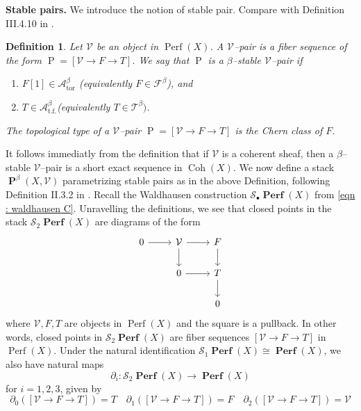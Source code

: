 \documentclass[11pt]{article}
\newtheorem{definition}{Definition}
\newcommand{\segal}{\mathcal{S}}
\newcommand{\fbeta}{\mathcal{F}^{\beta}}
\newcommand{\tbeta}{\mathcal{T}^{\beta}}
\newcommand{\abetator}{\mathcal{A}^{\beta}_{\operatorname{tor}}}
\newcommand{\abetatf}{\mathcal{A}^{\beta}_{\operatorname{t.f.}}}
\newcommand{\coh}{\operatorname{Coh}}
\newcommand{\perf}{\operatorname{Perf}(X)}
\newcommand{\perfstack}{\boldsymbol{\operatorname{Perf}}(X)}
\newcommand{\framing}{\mathcal{V}}
\newcommand{\pairs}{\boldsymbol{\operatorname{P}}^{\beta}(X,\mathcal{V})}
\newcommand{\waldhausen}{\mathcal{S}_{\bullet}}
\begin{document}
\noindent\textbf{Stable pairs. }We introduce the notion of stable pair. Compare with Definition III.4.10 in \cite{dps}.

\begin{definition}
    Let $\framing$ be an object in $\perf$. A $\framing$--pair is a fiber sequence of the form $\operatorname{P}= [\framing\rightarrow F \rightarrow T]$. We say that $\operatorname{P}$ is a $\beta$--stable $\framing$--pair if 
    \begin{enumerate}
        \item $F[1]\in \abetator$ (equivalently $F \in \fbeta$), and
        \item $T\in \abetatf$(equivalently $T \in \tbeta)$.
    \end{enumerate}
    The topological type of a $\framing$--pair $\operatorname{P}= [\framing\rightarrow F \rightarrow T]$ is the Chern class of $F$.
\end{definition}

\noindent It follows immediatly from the definition that if $\framing$ is a coherent sheaf, then a $\beta$--stable $\framing$--pair is a short exact sequence in $\coh(X)$. We now define a stack $\pairs$ parametrizing stable pairs as in the above Definition, following Definition II.3.2 in \cite{dps}. Recall the Waldhausen construction $\waldhausen\perfstack$ from \eqref{eqn : waldhausen C}. Unravelling the definitions, we see that closed points in the stack $\segal_2\perfstack$ are diagrams of the form 
\[\begin{tikzcd}
	0 & \framing& F \\
	& 0 & T \\
	&& 0
	\arrow[from=1-1, to=1-2]
	\arrow[from=1-2, to=1-3]
	\arrow[from=1-2, to=2-2]
	\arrow[from=1-3, to=2-3]
	\arrow[from=2-2, to=2-3]
	\arrow[from=2-3, to=3-3]
\end{tikzcd}\]
where $\framing, F, T$ are objects in $\perf$ and the square is a pullback. In other words, closed points in $\segal_2\perfstack$ are fiber sequences $[\framing\rightarrow F \rightarrow T]$ in $\perf$. Under the natural identification $\segal_1\perfstack \cong \perfstack$, we also have natural maps
\begin{equation}\label{eqn : delta maps}
\partial_i \colon \segal_2\perfstack \longrightarrow \perfstack
\end{equation}
for $i=1,2,3$, given by
\begin{equation}\label{eqn : delta maps}
    \partial_0([\framing\rightarrow F \rightarrow T])  = T \quad \partial_1([\framing\rightarrow F \rightarrow T]) = F \quad \partial_2([\framing\rightarrow F \rightarrow T]) = \framing
\end{equation}
\end{document}
